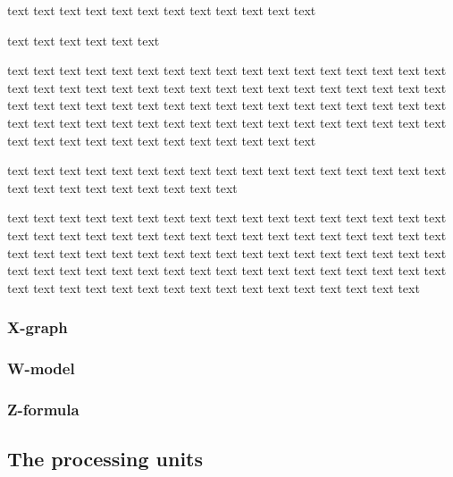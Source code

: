 \begin{paracol}{2}
text text text text text text text text text text text text 

text text text text text text 

text text text text text text text text text text text text text text text text text text text text text text text text text text text text text text text text text text text text text text text text text text text text text text text text text text text text text text text text text text text text text text text text text text text text text text text text text text text text text text text text 

text text text text text text text text text text text text text text text text text text text text text text text text text text 

text text text text text text text text text text text text text text text text text text text text text text text text text text text text text text text text text text text text text text text text text text text text text text text text text text text text text text text text text text text text text text text text text text text text text text text text text text text text text text text text text text text text 

\switchcolumn

\end{paracol}



\subsubsection{X-graph}
\label{ch:impl:model:xgraph}

\subsubsection{W-model}
\label{ch:impl:model:wmodel}

\subsubsection{Z-formula}
\label{ch:impl:model:zformula}


\subsection{The processing units} %
\label{ch:impl:proc}

